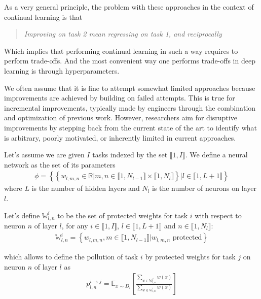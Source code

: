\documentclass{article}
\newcommand{\intset}[2]{\llbracket #1, #2 \rrbracket}
\begin{document}
As a very general principle, the problem with these approaches in the context of continual learning is that
\begin{quote}
    \itshape
    \centering
    Improving on task 2 mean regressing on task 1, and reciprocally
\end{quote}

\noindent
Which implies that performing continual learning in such a way requires to perform trade-offs. And the most convenient way one performs trade-offs in deep learning is through hyperparameters.

\vspace{0.5cm}

\noindent
We often assume that it is fine to attempt somewhat limited approaches because improvements are achieved by building on failed attempts. This is true for incremental improvements, typically made by engineers through the combination and optimization of previous work. However, researchers aim for disruptive improvements by stepping back from the current state of the art to identify what is arbitrary, poorly motivated, or inherently limited in current approaches.

\vspace{0.5cm}


\noindent
Let's assume we are given $I$ tasks indexed by the set $\intset{1}{I}$. We define a neural network as the set of its parameters
\begin{align}
    \phi = \left\{\left\{ w_{l,m,n} \in \mathbb{R} | m,n \in \llbracket 1, N_{l-1} \rrbracket \times \llbracket 1, N_{l} \rrbracket \right\} | l \in \llbracket 1, L+1 \rrbracket \right\}
\end{align}
where $L$ is the number of hidden layers and $N_l$ is the number of neurons on layer $l$.

\noindent
Let's define $\mathbb{W}_{l,n}^i$ to be the set of protected weights for task $i$ with respect to neuron $n$ of layer $l$, for any $i \in \intset{1}{I}$, $l \in \intset{1}{L+1}$ and $n \in \intset{1}{N_l}$:
\begin{align}
    \mathbb{W}_{l,n}^i = \left\{ w_{l,m,n}, m \in \intset{1}{N_{l-1}} | w_{l,m,n} \text{ protected} \right\}
\end{align}

\noindent
which allows to define the pollution of task $i$ by protected weights for task $j$ on neuron $n$ of layer $l$ as
\begin{align}
    p_{l,n}^{i\rightarrow j} = \mathbb{E}_{x \sim D_i}\left[\frac{\sum_{w \in \mathbb{W}_{l,n}^j}{w(x)}}{\sum_{w \in \mathbb{W}_{l,n}^i}{w(x)}}\right]
\end{align}
\end{document}
